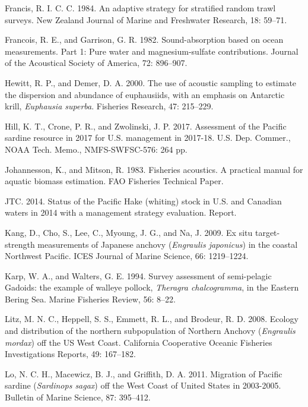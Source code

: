 \documentclass[]{article}
\begin{document}
\leavevmode\hypertarget{ref-Francis1984}{}%
Francis, R. I. C. C. 1984. An adaptive strategy for stratified random trawl surveys. New Zealand Journal of Marine and Freshwater Research, 18: 59--71.

\leavevmode\hypertarget{ref-Francois1982a}{}%
Francois, R. E., and Garrison, G. R. 1982. Sound-absorption based on ocean measurements. Part 1: Pure water and magnesium-sulfate contributions. Journal of the Acoustical Society of America, 72: 896--907.

\leavevmode\hypertarget{ref-Hewitt2000}{}%
Hewitt, R. P., and Demer, D. A. 2000. The use of acoustic sampling to estimate the dispersion and abundance of euphausiids, with an emphasis on Antarctic krill, \emph{Euphausia superba}. Fisheries Research, 47: 215--229.

\leavevmode\hypertarget{ref-Hill2017}{}%
Hill, K. T., Crone, P. R., and Zwolinski, J. P. 2017. Assessment of the Pacific sardine resource in 2017 for U.S. management in 2017-18. U.S. Dep. Commer., NOAA Tech. Memo., NMFS-SWFSC-576: 264 pp.

\leavevmode\hypertarget{ref-Johannesson1983}{}%
Johannesson, K., and Mitson, R. 1983. Fisheries acoustics. A practical manual for aquatic biomass estimation. FAO Fisheries Technical Paper.

\leavevmode\hypertarget{ref-JTC2014}{}%
JTC. 2014. Status of the Pacific Hake (whiting) stock in U.S. and Canadian waters in 2014 with a management strategy evaluation. Report.

\leavevmode\hypertarget{ref-Kang2009}{}%
Kang, D., Cho, S., Lee, C., Myoung, J. G., and Na, J. 2009. Ex situ target-strength measurements of Japanese anchovy (\emph{Engraulis japonicus}) in the coastal Northwest Pacific. ICES Journal of Marine Science, 66: 1219--1224.

\leavevmode\hypertarget{ref-Karp1994}{}%
Karp, W. A., and Walters, G. E. 1994. Survey assessment of semi-pelagic Gadoids: the example of walleye pollock, \emph{Theragra chalcogramma}, in the Eastern Bering Sea. Marine Fisheries Review, 56: 8--22.

\leavevmode\hypertarget{ref-Litz2008}{}%
Litz, M. N. C., Heppell, S. S., Emmett, R. L., and Brodeur, R. D. 2008. Ecology and distribution of the northern subpopulation of Northern Anchovy (\emph{Engraulis mordax}) off the US West Coast. California Cooperative Oceanic Fisheries Investigations Reports, 49: 167--182.

\leavevmode\hypertarget{ref-Lo2011}{}%
Lo, N. C. H., Macewicz, B. J., and Griffith, D. A. 2011. Migration of Pacific sardine (\emph{Sardinops sagax}) off the West Coast of United States in 2003-2005. Bulletin of Marine Science, 87: 395--412.
\end{document}
